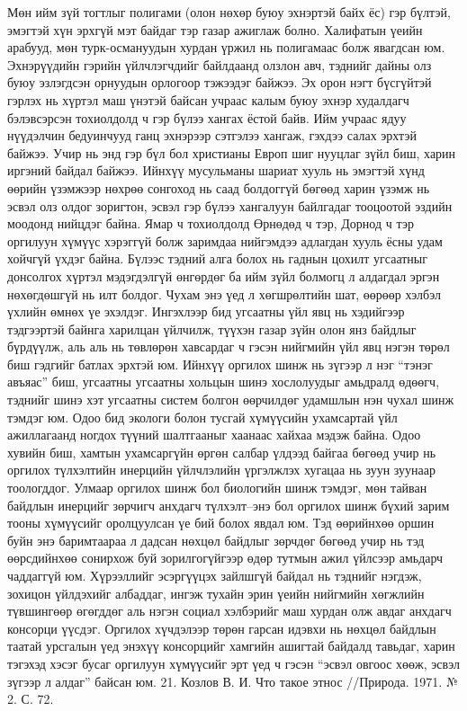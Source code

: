 Мөн ийм зүй тогтлыг полигами (олон нөхөр буюу эхнэртэй байх ёс) гэр бүлтэй, эмэгтэй хүн эрхгүй мэт байдаг тэр газар ажиглаж болно. Халифатын үеийн арабууд, мөн турк-османуудын хурдан үржил нь полигамаас болж явагдсан юм. Эхнэрүүдийн гэрийн үйлчлэгчдийг байлдаанд олзлон авч, тэднийг дайны олз буюу эзлэгдсэн орнуудын орлогоор тэжээдэг байжээ. Эх орон нэгт бүсгүйтэй гэрлэх нь хүртэл маш үнэтэй байсан учраас калым буюу эхнэр худалдагч бэлэвсэрсэн тохиолдолд ч гэр бүлээ хангах ёстой байв. Ийм учраас ядуу нүүдэлчин бедуинчууд ганц эхнэрээр сэтгэлээ хангаж, гэхдээ салах эрхтэй байжээ. Учир нь энд гэр бүл бол христианы Европ шиг нууцлаг зүйл биш, харин иргэний байдал байжээ. Ийнхүү мусульманы шариат хууль нь эмэгтэй хүнд өөрийн үзэмжээр нөхрөө сонгоход нь саад болдоггүй бөгөөд харин үзэмж нь эсвэл олз олдог зоригтон, эсвэл гэр бүлээ хангалуун байлгадаг тооцоотой эздийн моодонд нийцдэг байна. Ямар ч тохиолдолд Өрнөдөд ч тэр, Дорнод ч тэр оргилуун хүмүүс хэрэггүй болж заримдаа нийгэмдээ адлагдан хууль ёсны удам хойчгүй үхдэг байна.
Бүлээс тэдний алга болох нь гаднын цохилт угсаатныг донсолгох хүртэл мэдэгдэлгүй өнгөрдөг ба ийм зүйл болмогц л алдагдал эргэн нөхөгдөшгүй нь илт болдог. Чухам энэ үед л хөгшрөлтийн шат, өөрөөр хэлбэл үхлийн өмнөх үе эхэлдэг. Ингэхлээр бид угсаатны үйл явц нь хэдийгээр тэдгээртэй байнга харилцан үйлчилж, түүхэн газар зүйн олон янз байдлыг бүрдүүлж, аль аль нь төвлөрөн хавсардаг ч гэсэн нийгмийн үйл явц нэгэн төрөл биш гэдгийг батлах эрхтэй юм.
Ийнхүү оргилох шинж нь зүгээр л нэг “тэнэг авъяас” биш, угсаатны угсаатны хольцын шинэ хослолуудыг амьдралд өдөөгч, тэднийг шинэ хэт угсаатны систем болгон өөрчилдөг удамшлын нэн чухал шинж тэмдэг юм. Одоо бид экологи болон тусгай хүмүүсийн ухамсартай үйл ажиллагаанд ногдох түүний шалтгааныг хаанаас хайхаа мэдэж байна. Одоо хувийн биш, хамтын ухамсаргүйн өргөн салбар үлдээд байгаа бөгөөд учир нь оргилох түлхэлтийн инерцийн үйлчлэлийн үргэлжлэх хугацаа нь зуун зуунаар тоологддог. Улмаар оргилох шинж бол биологийн шинж тэмдэг, мөн тайван байдлын инерцийг зөрчигч анхдагч түлхэлт–энэ бол оргилох шинж бүхий зарим тооны хүмүүсийг оролцуулсан үе бий болох явдал юм.
Тэд өөрийнхөө оршин буйн энэ баримтаараа л дадсан нөхцөл байдлыг зөрчдөг бөгөөд учир нь тэд өөрсдийнхөө сонирхож буй зорилгогүйгээр өдөр тутмын ажил үйлсээр амьдарч чаддаггүй юм. Хүрээллийг эсэргүүцэх зайлшгүй байдал нь тэднийг нэгдэж, зохицон үйлдэхийг албаддаг, ингэж тухайн эрин үеийн нийгмийн хөгжлийн түвшингөөр өгөгддөг аль нэгэн социал хэлбэрийг маш хурдан олж авдаг анхдагч консорци үүсдэг. Оргилох хүчдэлээр төрөн гарсан идэвхи нь нөхцөл байдлын таатай урсгалын үед энэхүү консорцийг хамгийн ашигтай байдалд тавьдаг, харин тэгэхэд хэсэг бусаг оргилуун хүмүүсийг эрт үед ч гэсэн “эсвэл овгоос хөөж, эсвэл зүгээр л алдаг” байсан юм. 21. Козлов В. И. Что такое этнос //Природа. 1971. № 2. С. 72.
